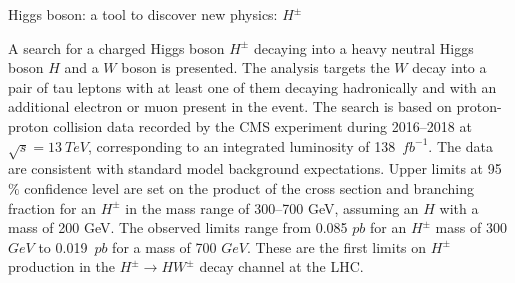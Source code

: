 \begin{MyArticle}[enhanced, tikz={rotate=0}]{Higgs boson: a tool to
    discover new physics: $H^{\pm}$}
  \begin{multicols}{2}
  A search for a charged Higgs boson $H^{\pm}$ decaying
  into a heavy neutral Higgs boson $H$ and a $W$ boson
  is presented. The analysis targets the $W$ decay into a pair
  of tau leptons with at least one of them decaying hadronically and
  with an additional electron or muon present in the event.
  The search is based on proton-proton collision data
  recorded by the CMS experiment during 2016--2018 at
  $\sqrt{s} = 13~TeV$, corresponding to an integrated
  luminosity of 138~$fb^{-1}$. The data are consistent with
  standard model background expectations. Upper limits at 95$\%$ confidence
  level are set on the product of the cross section and branching fraction
  for an $H^{\pm}$ in the mass range of 300--700 GeV, assuming an $H$ 
  with a mass of 200 GeV. The observed limits range from
  0.085 $pb$ for an $H^{\pm}$ mass of
  300 $GeV$ to 0.019~$pb$ for a mass of
  700 $GeV$. These are the first limits on $H^{\pm}$
  production in the $H^{\pm} \to H W^{\pm}$ decay channel at the LHC.
  \end{multicols}
\end{MyArticle}
